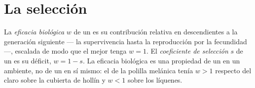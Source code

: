 \section{La selección}

\begin{definition}\label{def:b2:population-genetics:fitness}
La \emph{eficacia biológica} $w$ de un  es su contribución
relativa en descendientes a la generación siguiente --- la supervivencia
hasta la reproducción por la fecundidad ---, escalada de modo que el mejor
 tenga $w = 1$. El \emph{coeficiente de selección} $s$ de un
 es su déficit,
$w = 1 - s$. La eficacia biológica es una propiedad de un  en un
ambiente, no de un  en sí mismo: el  de la polilla melánica
tenía $w > 1$ respecto del claro sobre la  cubierta de hollín y
$w < 1$ sobre los líquenes.
\end{definition}

